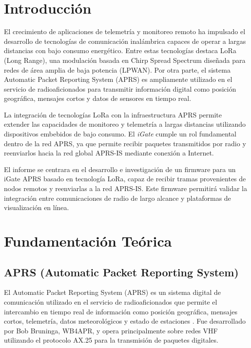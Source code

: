 \documentclass[conference]{IEEEtran}
\begin{document}
\section{Introducción}

El crecimiento de aplicaciones de telemetría y monitoreo remoto ha impulsado el desarrollo de tecnologías de comunicación inalámbrica capaces de operar a largas distancias con bajo consumo energético. Entre estas tecnologías destaca LoRa (Long Range), una modulación basada en Chirp Spread Spectrum diseñada para redes de área amplia de baja potencia (LPWAN). Por otra parte, el sistema Automatic Packet Reporting System (APRS) es ampliamente utilizado en el servicio de radioaficionados para transmitir información digital como posición geográfica, mensajes cortos y datos de sensores en tiempo real.

La integración de tecnologías LoRa con la infraestructura APRS permite extender las capacidades de monitoreo y telemetría a largas distancias utilizando dispositivos embebidos de bajo consumo. El \textit{iGate}  cumple un rol fundamental dentro de la red APRS, ya que permite recibir paquetes transmitidos por radio y reenviarlos hacia la red global APRS-IS mediante conexión a Internet.

El informe se centrara en el desarrollo  e investigación de un firmware para un iGate APRS basado en tecnología LoRa, capaz de recibir tramas provenientes de nodos remotos y reenviarlas a la red APRS-IS. Este firmware permitirá validar la integración entre comunicaciones de radio de largo alcance y plataformas de visualización en línea.





\section{Fundamentación Teórica}

\subsection{APRS (Automatic Packet Reporting System)}

El Automatic Packet Reporting System (APRS) es un sistema digital de comunicación utilizado en el servicio de radioaficionados que permite el intercambio en tiempo real de información como posición geográfica, mensajes cortos, telemetría, datos meteorológicos y estado de estaciones \cite{aprs_web}. Fue desarrollado por Bob Bruninga, WB4APR, y opera principalmente sobre redes VHF utilizando el protocolo AX.25 para la transmisión de paquetes digitales.
\end{document}
